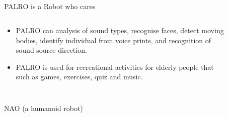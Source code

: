 \documentclass[compress]{beamer}
\begin{document}
\subsection{}
{
\begin{frame}{PALRO is a Robot who cares}

  \begin{columns}


      \begin{column}{0.6\linewidth}
      \centering

          \begin{itemize}
              \item PALRO can analysis of sound types, recognise faces,
              detect moving bodies, identify individual from voice prints,
              and recognition of sound source direction.
              \item PALRO is used for recreational activities for elderly people
              that such as games, exercises, quiz and music.
          \end{itemize}

      \end{column}


      \begin{column}{0.6\linewidth}

          \begin{figure}
              \centering
          \end{figure}

        \end{column}

     \end{columns}

\end{frame}
}




\subsection{}
{
\begin{frame}{NAO (a humanoid robot)}



          \begin{figure}
              \centering
          \end{figure}

\end{frame}
}
\end{document}

